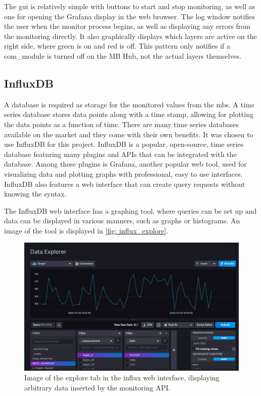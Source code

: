 \documentclass[main.tex]{subfiles}
\begin{document}
The \gls{gui} is relatively simple with buttons to start and stop monitoring, as well as one for opening the Grafana display in the web browser. The log window notifies the user when the monitor process begins, as well as displaying any errors from the monitoring directly. It also graphically displays which layers are active on the right side, where green is on and red is off. This pattern only notifies if a com\_module is turned off on the MB Hub, not the actual layers themselves.

\subsection{InfluxDB}
\label{ssec: influxdb}
A database is required as storage for the monitored values from the \gls{mb}s. A time series database stores data points along with a time stamp, allowing for plotting the data points as a function of time. There are many time series databases available on the market and they come with their own benefits. It was chosen to use InfluxDB for this project. InfluxDB is a popular, open-source, time series database featuring many plugins and APIs that can be integrated with the database. Among these plugins is Grafana, another popular web tool, used for visualizing data and plotting graphs with professional, easy to use interfaces. InfluxDB also features a web interface that can create query requests without knowing the syntax.

The InfluxDB web interface has a graphing tool, where queries can be set up and data can be displayed in various manners, such as graphs or histograms. An image of the tool is displayed in \autoref{fig: influx_explore}.

\begin{figure}[!htpb]
    \centering
    \includegraphics[width=12cm]{images/influx_explore.png}
    \caption{Image of the explore tab in the influx web interface, displaying arbitrary data inserted by the monitoring API.}
    \label{fig: influx_explore}
\end{figure}
\FloatBarrier
\end{document}
